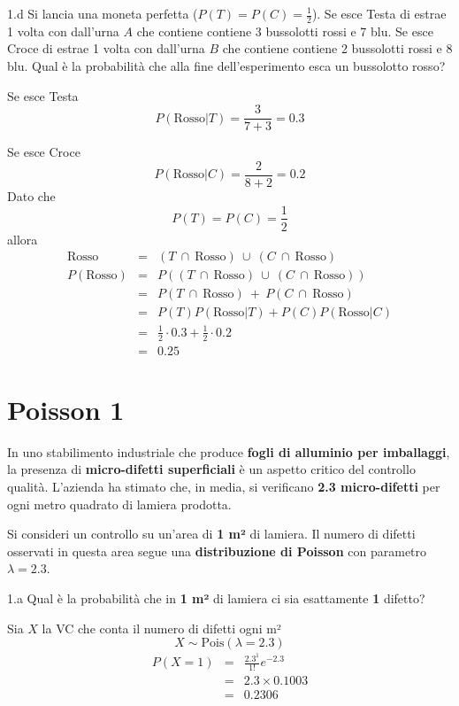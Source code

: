\documentclass[
  11pt,
]{book}
\theoremstyle{mytheoremstyle}
\theoremstyle{mydefstyle}
\newenvironment{sol}
  {
  \begin{tcolorbox}[enhanced,breakable,arc=0.1mm,boxrule=1pt,colback=white,colframe=iblue,
  title=\bf \fontfamily{lmss}\selectfont \hspace{.5 cm} Soluzione,drop fuzzy shadow]

}{
\end{tcolorbox}
  }
\begin{document}
1.d Si lancia una moneta perfetta (\(P(T)=P(C)=\frac 12\)).
Se esce Testa di estrae 1 volta con dall'urna \(A\) che contiene contiene 3 bussolotti rossi e 7 blu.
Se esce Croce di estrae 1 volta con dall'urna \(B\) che contiene contiene 2 bussolotti rossi e 8 blu.
Qual è la probabilità che alla fine dell'esperimento esca un bussolotto rosso?

\begin{sol}
Se esce Testa
\[
P(\mbox{Rosso}|T)=\frac{3}{7+3}=0.3
\]

Se esce Croce
\[
P(\mbox{Rosso}|C)=\frac{2}{8+2}=0.2
\]
Dato che
\[
P(T)=P(C)=\frac 12
\]
allora
\begin{eqnarray*}
\mbox{Rosso}&=& (T~\cap~\mbox{Rosso})~\cup~ (C~\cap~\mbox{Rosso})\\
P(\mbox{Rosso})&=&P((T~\cap~\mbox{Rosso})~\cup~ (C~\cap~\mbox{Rosso}))\\
&=&P(T~\cap~\mbox{Rosso})~+~ P(C~\cap~\mbox{Rosso})\\
&=&P(T)P(\mbox{Rosso}|T)+P(C)P(\mbox{Rosso}|C)\\
&=&\frac 12\cdot 0.3+\frac 12 \cdot 0.2\\
&=&0.25
\end{eqnarray*}

\end{sol}

\section{Poisson 1}\label{poisson-1}

In uno stabilimento industriale che produce \textbf{fogli di alluminio per imballaggi}, la presenza di \textbf{micro-difetti superficiali} è un aspetto critico del controllo qualità. L'azienda ha stimato che, in media, si verificano \textbf{2.3 micro-difetti} per ogni metro quadrato di lamiera prodotta.

Si consideri un controllo su un'area di \textbf{1 m²} di lamiera. Il numero di difetti osservati in questa area segue una \textbf{distribuzione di Poisson} con parametro \(\lambda = 2.3\).

1.a Qual è la probabilità che in \textbf{1 m²} di lamiera ci sia esattamente \textbf{1} difetto?

\begin{sol}
Sia \(X\) la VC che conta il numero di difetti ogni m²
\[
X\sim\text{Pois}(\lambda=2.3)
\]
\begin{eqnarray*}
   P( X = 1 )  &=& \frac{ 2.3 ^{ 1 }}{ 1 !}e^{- 2.3 }\\                 &=& 2.3 \times 0.1003 \\                 &=& 0.2306 
\end{eqnarray*}

\end{sol}
\end{document}
